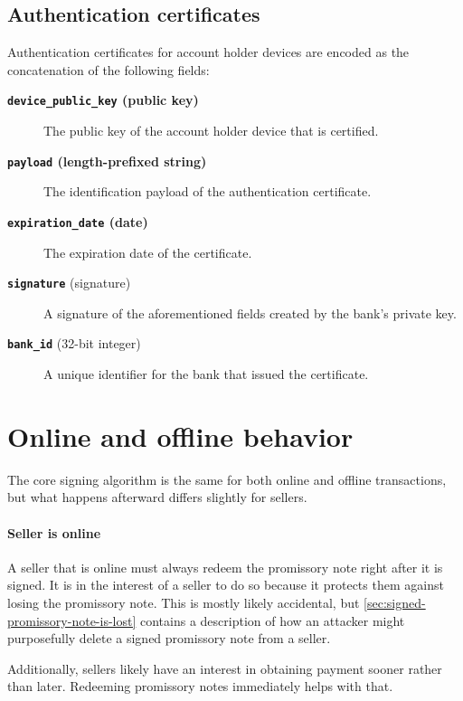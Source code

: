 \documentclass[12pt,a4paper]{article}
\begin{document}
\begin{multicols}{2}
	\subsection{Authentication certificates}

  	Authentication certificates for account holder devices are encoded as the concatenation of the following fields:

	\begin{description}
		\item[\textbf{\texttt{device\_public\_key} (public key)}] The public key of the account holder device that is certified.
		
		\item[\textbf{\texttt{payload} (length-prefixed string)}] The identification payload of the authentication certificate.
		
		\item[\textbf{\texttt{expiration\_date} (date)}] The expiration date of the certificate.
		
		\item[\textbf{\texttt{signature}} (signature)] A signature of the aforementioned fields created by the bank's private key.
		
		\item[\textbf{\texttt{bank\_id}} (32-bit integer)] A unique identifier for the bank that issued the certificate.
	\end{description}

	\section{Online and offline behavior}

	The core signing algorithm is the same for both online and offline transactions, but what happens afterward differs slightly for sellers.

	\paragraph{Seller is online}
	
	A seller that is online must always redeem the promissory note right after it is signed. It is in the interest of a seller to do so because it protects them against losing the promissory note. This is mostly likely accidental, but \autoref{sec:signed-promissory-note-is-lost} contains a description of how an attacker might purposefully delete a signed promissory note from a seller.

	Additionally, sellers likely have an interest in obtaining payment sooner rather than later. Redeeming promissory notes immediately helps with that.


\end{multicols}
\end{document}
